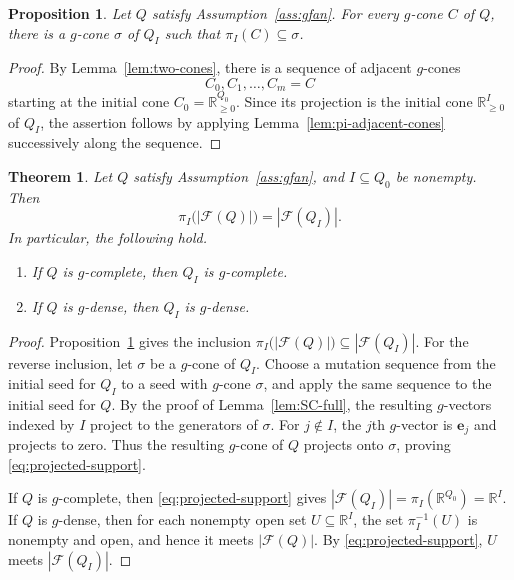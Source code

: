 \documentclass[11pt,reqno]{amsart}
\numberwithin{equation}{section}
\theoremstyle{definition}
\theoremstyle{plain}
\newtheorem{theorem}[example]{Theorem}
\newtheorem{proposition}[example]{Proposition}
\begin{document}
	\begin{proposition}\label{prop:pi-in-cone}
		Let $Q$ satisfy Assumption~\ref{ass:gfan}. For every $g$-cone $C$ of $Q$, there is a $g$-cone $\sigma$ of $Q_I$ such that $\pi_I(C)\subseteq\sigma$.
	\end{proposition}
	
	\begin{proof}
		By Lemma~\ref{lem:two-cones}, there is a sequence of adjacent $g$-cones
		\[
		C_0,C_1,\ldots,C_m=C
		\]
		starting at the initial cone $C_0=\mathbb R_{\geq0}^{Q_0}$. Since its projection is the initial cone $\mathbb R_{\geq0}^I$ of $Q_I$, the assertion follows by applying Lemma~\ref{lem:pi-adjacent-cones} successively along the sequence.
	\end{proof}
	
	\begin{theorem}\label{thm:I-gcomp-gdense}
		Let $Q$ satisfy Assumption~\ref{ass:gfan}, and $I\subseteq Q_0$ be nonempty. Then
		\begin{equation}\label{eq:projected-support}
			\pi_I\bigl(|\mathcal F(Q)|\bigr)=|\mathcal F(Q_I)|.
		\end{equation}
		In particular, the following hold.
		\begin{enumerate}[label=\textup{(\arabic*)}]
			\item If $Q$ is $g$-complete, then $Q_I$ is $g$-complete.
			\item If $Q$ is $g$-dense, then $Q_I$ is $g$-dense.
		\end{enumerate}
	\end{theorem}
	
	\begin{proof}
		Proposition~\ref{prop:pi-in-cone} gives the inclusion $\pi_I\bigl(|\mathcal F(Q)|\bigr)\subseteq|\mathcal F(Q_I)|$. For the reverse inclusion, let $\sigma$ be a $g$-cone of $Q_I$. Choose a mutation sequence from the initial seed for $Q_I$ to a seed with $g$-cone $\sigma$, and apply the same sequence to the initial seed for $Q$. By the proof of Lemma~\ref{lem:SC-full}, the resulting $g$-vectors indexed by $I$ project to the generators of $\sigma$. For $j\notin I$, the $j$th $g$-vector is $\mathbf{e}_j$ and projects to zero. Thus the resulting $g$-cone of $Q$ projects onto $\sigma$, proving \eqref{eq:projected-support}.
		
		If $Q$ is $g$-complete, then \eqref{eq:projected-support} gives $|\mathcal F(Q_I)|=\pi_I(\mathbb R^{Q_0})=\mathbb R^I$. If $Q$ is $g$-dense, then for each nonempty open set $U\subseteq\mathbb R^I$, the set $\pi_I^{-1}(U)$ is nonempty and open, and hence it meets $|\mathcal F(Q)|$. By \eqref{eq:projected-support}, $U$ meets $|\mathcal F(Q_I)|$.
	\end{proof}
\end{document}
